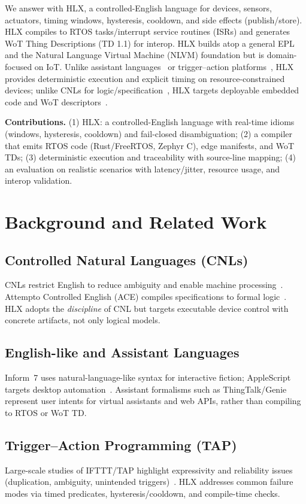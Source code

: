 \documentclass[journal]{IEEEtran}
\begin{document}
We answer with HLX, a controlled-English language for devices, sensors, actuators, timing windows, hysteresis, cooldown, and side effects (publish/store). HLX compiles to RTOS tasks/interrupt service routines (ISRs) and generates WoT Thing Descriptions (TD 1.1) for interop. HLX builds atop a general EPL and the Natural Language Virtual Machine (NLVM) foundation but is domain-focused on IoT. Unlike assistant languages~\cite{ThingTalk22,GeniePLDI19} or trigger–action platforms~\cite{UrIFTTT16,BrackenburyTAP19}, HLX provides deterministic execution and explicit timing on resource-constrained devices; unlike CNLs for logic/specification~\cite{KuhnCNL14,ACEManual}, HLX targets deployable embedded code and WoT descriptors~\cite{WoT11}.

\textbf{Contributions.} (1) HLX: a controlled-English language with real-time idioms (windows, hysteresis, cooldown) and fail-closed disambiguation; (2) a compiler that emits RTOS code (Rust/FreeRTOS, Zephyr C), edge manifests, and WoT TDs; (3) deterministic execution and traceability with source-line mapping; (4) an evaluation on realistic scenarios with latency/jitter, resource usage, and interop validation.

\section{Background and Related Work}
\subsection{Controlled Natural Languages (CNLs)}
CNLs restrict English to reduce ambiguity and enable machine processing~\cite{KuhnCNL14}. Attempto Controlled English (ACE) compiles specifications to formal logic~\cite{ACEManual}. HLX adopts the \emph{discipline} of CNL but targets executable device control with concrete artifacts, not only logical models.

\subsection{English-like and Assistant Languages}
Inform~7 uses natural-language-like syntax for interactive fiction; AppleScript targets desktop automation~\cite{InformSite,AppleScriptGuide}. Assistant formalisms such as ThingTalk/Genie~\cite{ThingTalk22,GeniePLDI19} represent user intents for virtual assistants and web APIs, rather than compiling to RTOS or WoT TD.

\subsection{Trigger–Action Programming (TAP)}
Large-scale studies of IFTTT/TAP highlight expressivity and reliability issues (duplication, ambiguity, unintended triggers)~\cite{UrIFTTT16,BrackenburyTAP19}. HLX addresses common failure modes via timed predicates, hysteresis/cooldown, and compile-time checks.
\end{document}
